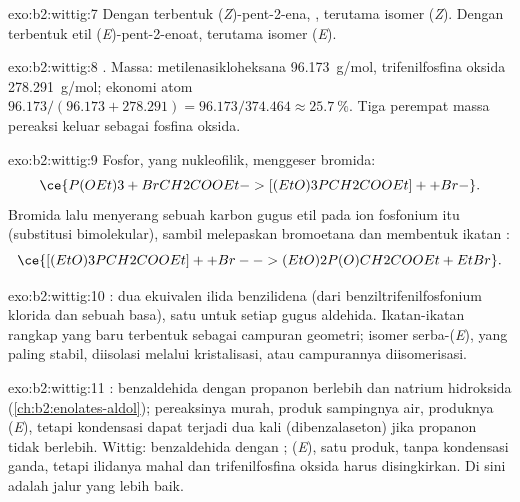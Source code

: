 \begin{solution}{exo:b2:wittig:7}
Dengan  terbentuk (\textit{Z})-pent-2-ena,
, terutama isomer (\textit{Z}). Dengan
 terbentuk etil (\textit{E})-pent-2-enoat, terutama
isomer (\textit{E}).
\end{solution}

\begin{solution}{exo:b2:wittig:8}
. Massa: metilenasikloheksana
\qty{96.173}{g/mol}, trifenilfosfina oksida \qty{278.291}{g/mol}; ekonomi
atom $96.173/(96.173 + 278.291) =
96.173/374.464 \approx 25.7~\%$. Tiga perempat massa pereaksi keluar sebagai fosfina oksida.
\end{solution}

\begin{solution}{exo:b2:wittig:9}
Fosfor, yang nukleofilik, menggeser bromida:
\begin{equation*}
\ce{P(OEt)3 + BrCH2COOEt -> [(EtO)3PCH2COOEt]+ + Br-}.
\end{equation*}
Bromida
lalu menyerang sebuah karbon gugus etil pada ion fosfonium itu (substitusi
bimolekular), sambil melepaskan bromoetana dan membentuk ikatan :
\begin{equation*}
\ce{[(EtO)3PCH2COOEt]+ + Br- -> (EtO)2P(O)CH2COOEt + EtBr}.
\end{equation*}
\end{solution}

\begin{solution}{exo:b2:wittig:10}
:
dua ekuivalen ilida benzilidena (dari benziltrifenilfosfonium klorida dan
sebuah basa), satu untuk setiap gugus aldehida. Ikatan-ikatan rangkap yang
baru terbentuk sebagai campuran geometri; isomer serba-(\textit{E}), yang
paling stabil, diisolasi melalui kristalisasi, atau campurannya
diisomerisasi.
\end{solution}

\begin{solution}{exo:b2:wittig:11}
: benzaldehida dengan propanon berlebih dan natrium hidroksida
(\cref{ch:b2:enolates-aldol}); pereaksinya murah, produk sampingnya air,
produknya (\textit{E}), tetapi kondensasi dapat terjadi dua kali
(dibenzalaseton) jika propanon tidak berlebih. Wittig: benzaldehida dengan
; (\textit{E}), satu produk, tanpa kondensasi ganda, tetapi
ilidanya mahal dan trifenilfosfina oksida harus disingkirkan. Di sini 
adalah jalur yang lebih baik.
\end{solution}

